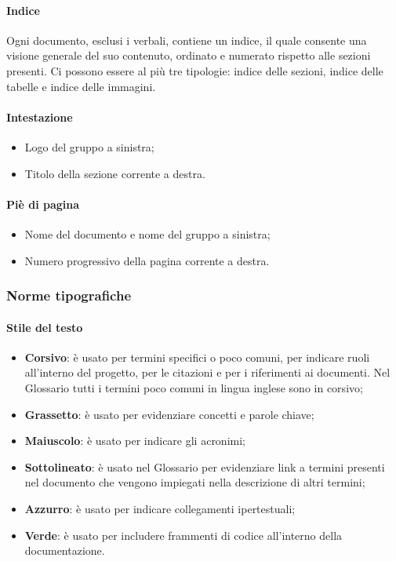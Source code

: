 \paragraph{Indice} \Spazio
Ogni documento, esclusi i verbali, contiene un indice, il quale consente una visione generale del suo contenuto, ordinato e numerato rispetto alle sezioni presenti.
Ci possono essere al più tre tipologie: indice delle sezioni, indice delle tabelle e indice delle immagini.

\paragraph{Intestazione}
\begin{itemize}
	\item Logo del gruppo a sinistra;
	\item Titolo della sezione corrente a destra.
\end{itemize}


\paragraph{Piè di pagina}
\begin{itemize}
	\item Nome del documento e nome del gruppo a sinistra;
	\item Numero progressivo della pagina corrente a destra.
\end{itemize}

\subsubsection{Norme tipografiche}
\paragraph{Stile del testo}
	\begin{itemize}
		\item \textbf{Corsivo}: è usato per termini specifici o poco comuni, per indicare ruoli all’interno del progetto, per le citazioni e per i riferimenti ai documenti. Nel Glossario tutti i termini poco comuni in lingua inglese sono in corsivo;
		\item \textbf{Grassetto}: è usato per evidenziare concetti e parole chiave;
		\item \textbf{Maiuscolo}: è usato per indicare gli acronimi;
		\item \textbf{Sottolineato}: è usato nel Glossario per evidenziare link a termini presenti nel documento che vengono impiegati nella descrizione di altri termini;
		\item \textbf{Azzurro}: è usato per indicare collegamenti ipertestuali;
		\item \textbf{Verde}: è usato per includere frammenti di codice all'interno della documentazione.
	\end{itemize}
